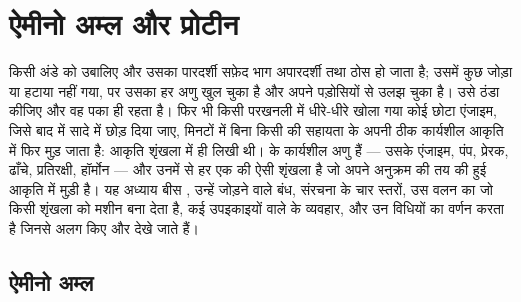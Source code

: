 \chapter{ऐमीनो अम्ल और प्रोटीन}\label{ch:b1:proteins}

किसी अंडे को उबालिए और उसका पारदर्शी सफ़ेद भाग अपारदर्शी तथा ठोस हो जाता
है; उसमें कुछ जोड़ा या हटाया नहीं गया, पर उसका हर  अणु खुल चुका है
और अपने पड़ोसियों से उलझ चुका है। उसे ठंडा कीजिए और वह पका ही रहता है।
फिर भी किसी परखनली में धीरे-धीरे खोला गया कोई छोटा एंजाइम, जिसे बाद में
सादे  में छोड़ दिया जाए, मिनटों में बिना किसी की सहायता के अपनी ठीक
कार्यशील आकृति में फिर मुड़ जाता है: आकृति शृंखला में ही लिखी थी। 
 के कार्यशील अणु हैं --- उसके एंजाइम, पंप, प्रेरक, ढाँचे,
प्रतिरक्षी, हॉर्मोन --- और उनमें से हर एक  की ऐसी शृंखला है
जो अपने अनुक्रम की तय की हुई आकृति में मुड़ी है। यह अध्याय बीस , उन्हें जोड़ने वाले बंध,  संरचना के चार स्तरों, उस वलन का
जो किसी शृंखला को मशीन बना देता है, कई उपइकाइयों वाले  के 
व्यवहार, और उन विधियों का वर्णन करता है जिनसे  अलग किए और देखे
जाते हैं।

\section{ऐमीनो अम्ल}

